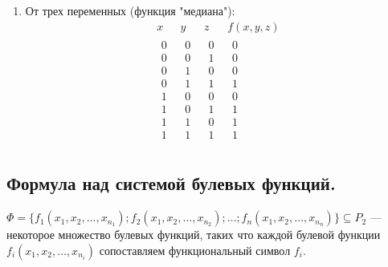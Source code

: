 \begin{enumerate}
	\item
	От трех переменных (функция "медиана"):
	$$
	\begin{array}{rrr|c}
		x~~ & y~~ & z~~ & f(x,y,z)\\
		\hline
		\begin{array}{r} %
			0\\ 0\\ 0\\ 0\\ 1\\ 1\\ 1\\ 1\\
		\end{array}
		&
		\begin{array}{r}
			0\\ 0\\ 1\\ 1\\ 0\\ 0\\ 1\\ 1\\
		\end{array}
		&
		\begin{array}{r}
			0\\ 1\\ 0\\ 1\\ 0\\ 1\\ 0\\ 1\\
		\end{array}
		&
		\begin{array}{r}
			0\\ 0\\ 0\\ 1\\ 0\\ 1\\ 1\\ 1\\
		\end{array}
	\end{array}
	$$
\end{enumerate}	


\subsection{Формула над системой булевых функций.}
$
	\Phi =
	\{
		f_{1}(x_{1}, x_{2}, \ldots, x_{n_1});
		f_{2}(x_{1}, x_{2}, \ldots, x_{n_2});
		\ldots;
		f_{n}(x_{1}, x_{2}, \ldots, x_{n_n})
	\} \subseteq P_2
$ --- некоторое множество булевых функций,
	таких что каждой булевой функции $f_{i}(x_{1}, x_{2}, \ldots, x_{n_i})$
	сопоставляем функциональный символ $f_{i}$.

